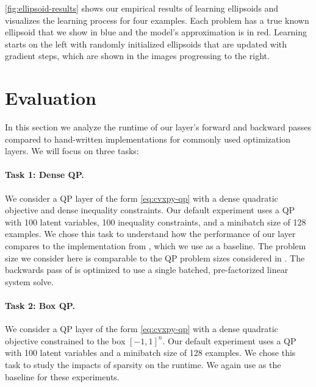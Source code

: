 \cref{fig:ellipsoid-results} shows our empirical results of
learning ellipsoids and visualizes the learning process for
four examples.
Each problem has a true known ellipsoid that we show in blue
and the model's approximation is in red.
Learning starts on the left with randomly initialized
ellipsoids that are updated with gradient steps,
which are shown in the images progressing to the right.

\section{Evaluation}
\label{sec:eval}

In this section we analyze the runtime of our layer's forward
and backward passes compared to hand-written implementations
for commonly used optimization layers.
We will focus on three tasks:

\paragraph{Task 1: Dense QP.}
We consider a QP layer of the form
\cref{eq:cvxpy-qp} with a dense quadratic objective
and dense inequality constraints.
Our default experiment uses a QP with 100 latent
variables, 100 inequality constraints, and
a minibatch size of 128 examples.
We chose this task to understand how the performance
of our \cvxpy{} layer compares to the \qpth implementation
from \citet{amos2017optnet}, which we use as a baseline.
The problem size we consider here is comparable
to the QP problem sizes considered in \citet{amos2017optnet}.
The backwards pass of \qpth is optimized to use a single
batched, pre-factorized linear system solve.

\paragraph{Task 2: Box QP.}
We consider a QP layer of the form
\cref{eq:cvxpy-qp} with a dense quadratic objective
constrained to the box $[-1, 1]^n$.
Our default experiment uses a QP with 100 latent
variables and a minibatch size of 128 examples.
We chose this task to study the impacts of
sparsity on the runtime.
We again use \qpth as the baseline for these experiments.

